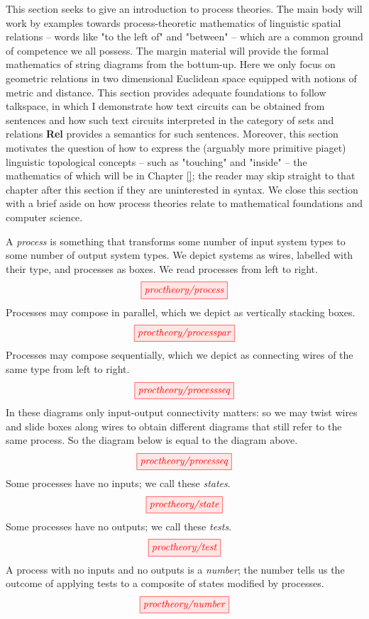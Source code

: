 
\marginnote{
\begin{theorem}[Graphical?]

\end{theorem}
}


This section seeks to give an introduction to process theories. The main body will work by examples towards process-theoretic mathematics of linguistic spatial relations -- words like "to the left of" and "between" -- which are a common ground of competence we all possess. The margin material will provide the formal mathematics of string diagrams from the bottum-up. Here we only focus on geometric relations in two dimensional Euclidean space equipped with notions of metric and distance. This section provides adequate foundations to follow \citep{}talkspace, in which I demonstrate how text circuits can be obtained from sentences and how such text circuits interpreted in the category of sets and relations \textbf{Rel} provides a semantics for such sentences. Moreover, this section motivates the question of how to express the (arguably more primitive \citep{}piaget) linguistic topological concepts -- such as "touching" and "inside" -- the mathematics of which will be in Chapter \ref{}; the reader may skip straight to that chapter after this section if they are uninterested in syntax. We close this section with a brief aside on how process theories relate to mathematical foundations and computer science.

A \emph{process} is something that transforms some number of input system types to some number of output system types. We depict systems as wires, labelled with their type, and processes as boxes. We read processes from left to right.
\[\tikzfig{proctheory/process}\]
Processes may compose in parallel, which we depict as vertically stacking boxes.
\[\tikzfig{proctheory/processpar}\]
Processes may compose sequentially, which we depict as connecting wires of the same type from left to right.
\[\tikzfig{proctheory/processseq}\]
In these diagrams only input-output connectivity matters: so we may twist wires and slide boxes along wires to obtain different diagrams that still refer to the same process. So the diagram below is equal to the diagram above.
\[\tikzfig{proctheory/processeq}\]
Some processes have no inputs; we call these \emph{states}. 
\[\tikzfig{proctheory/state}\]
Some processes have no outputs; we call these \emph{tests}.
\[\tikzfig{proctheory/test}\]
A process with no inputs and no outputs is a \emph{number}; the number tells us the outcome of applying tests to a composite of states modified by processes.
\[\tikzfig{proctheory/number}\]

